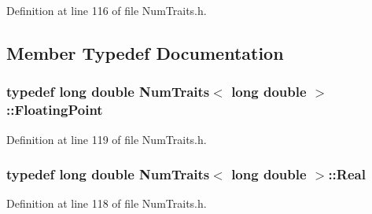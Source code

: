 Definition at line 116 of file Num\-Traits.\-h.



\subsection{Member Typedef Documentation}
\hypertarget{struct_num_traits_3_01long_01double_01_4_a13ad4b53be61a6f04ca51a2e7d03d405}{
\subsubsection[{Floating\-Point}]{\setlength{\rightskip}{0pt plus 5cm}typedef {\bf long} {\bf double} {\bf Num\-Traits}$<$ {\bf long} {\bf double} $>$\-::{\bf Floating\-Point}}}\label{struct_num_traits_3_01long_01double_01_4_a13ad4b53be61a6f04ca51a2e7d03d405}


Definition at line 119 of file Num\-Traits.\-h.

\hypertarget{struct_num_traits_3_01long_01double_01_4_adf288ae9ac1093dfe8645cc202ba5e1e}{
\subsubsection[{Real}]{\setlength{\rightskip}{0pt plus 5cm}typedef {\bf long} {\bf double} {\bf Num\-Traits}$<$ {\bf long} {\bf double} $>$\-::{\bf Real}}}\label{struct_num_traits_3_01long_01double_01_4_adf288ae9ac1093dfe8645cc202ba5e1e}


Definition at line 118 of file Num\-Traits.\-h.



